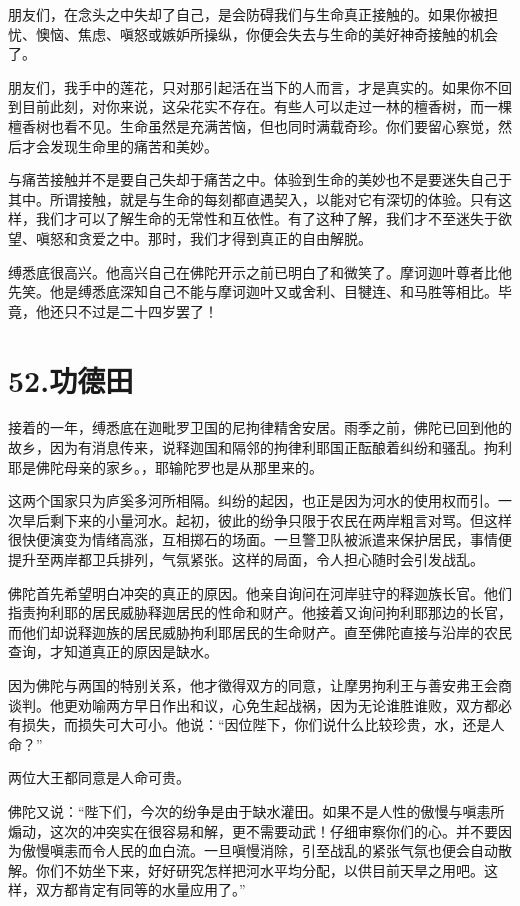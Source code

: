 \documentclass[12pt,twoside,openany]{book}
\begin{document}
朋友们，在念头之中失却了自己，是会防碍我们与生命真正接触的。如果你被担忧、懊恼、焦虑、嗔怒或嫉妒所操纵，你便会失去与生命的美好神奇接触的机会了。

朋友们，我手中的莲花，只对那引起活在当下的人而言，才是真实的。如果你不回到目前此刻，对你来说，这朵花实不存在。有些人可以走过一林的檀香树，而一棵檀香树也看不见。生命虽然是充满苦恼，但也同时满载奇珍。你们要留心察觉，然后才会发现生命里的痛苦和美妙。

与痛苦接触并不是要自己失却于痛苦之中。体验到生命的美妙也不是要迷失自己于其中。所谓接触，就是与生命的每刻都直遇契入，以能对它有深切的体验。只有这样，我们才可以了解生命的无常性和互依性。有了这种了解，我们才不至迷失于欲望、嗔怒和贪爱之中。那时，我们才得到真正的自由解脱。

缚悉底很高兴。他高兴自己在佛陀开示之前已明白了和微笑了。摩诃迦叶尊者比他先笑。他是缚悉底深知自己不能与摩诃迦叶又或舍利、目犍连、和马胜等相比。毕竟，他还只不过是二十四岁罢了！


\chapter{52.功德田}\label{ch52}

接着的一年，缚悉底在迦毗罗卫国的尼拘律精舍安居。雨季之前，佛陀已回到他的故乡，因为有消息传来，说释迦国和隔邻的拘律利耶国正酝酿着纠纷和骚乱。拘利耶是佛陀母亲的家乡。，耶输陀罗也是从那里来的。

这两个国家只为庐奚多河所相隔。纠纷的起因，也正是因为河水的使用权而引。一次旱后剩下来的小量河水。起初，彼此的纷争只限于农民在两岸粗言对骂。但这样很快便演变为情绪高涨，互相掷石的场面。一旦警卫队被派遣来保护居民，事情便提升至两岸都卫兵排列，气氛紧张。这样的局面，令人担心随时会引发战乱。

佛陀首先希望明白冲突的真正的原因。他亲自询问在河岸驻守的释迦族长官。他们指责拘利耶的居民威胁释迦居民的性命和财产。他接着又询问拘利耶那边的长官，而他们却说释迦族的居民威胁拘利耶居民的生命财产。直至佛陀直接与沿岸的农民查询，才知道真正的原因是缺水。

因为佛陀与两国的特别关系，他才徵得双方的同意，让摩男拘利王与善安弗王会商谈判。他更劝喻两方早日作出和议，心免生起战祸，因为无论谁胜谁败，双方都必有损失，而损失可大可小。他说：“因位陛下，你们说什么比较珍贵，水，还是人命？”

两位大王都同意是人命可贵。

佛陀又说：“陛下们，今次的纷争是由于缺水灌田。如果不是人性的傲慢与嗔恚所煽动，这次的冲突实在很容易和解，更不需要动武！仔细审察你们的心。并不要因为傲慢嗔恚而令人民的血白流。一旦嗔慢消除，引至战乱的紧张气氛也便会自动散解。你们不妨坐下来，好好研究怎样把河水平均分配，以供目前天旱之用吧。这样，双方都肯定有同等的水量应用了。”
\end{document}
